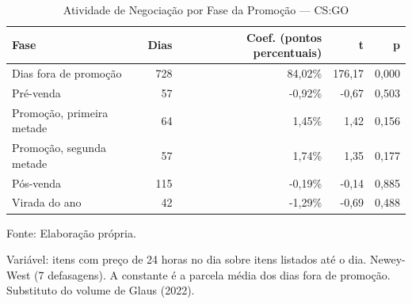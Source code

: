 \begin{table}[H]
\caption{Atividade de Negociação por Fase da Promoção — CS:GO}\label{tab:sale_activity} 

\fontsize{12.0pt}{14.4pt}\selectfont

\begin{tabular*}{\linewidth}{@{\extracolsep{\fill}}lrrrr}
\toprule
\textbf{Fase} & \textbf{Dias} & \textbf{Coef. (pontos percentuais)} & \textbf{t} & \textbf{p} \\
\midrule\addlinespace[2.5pt]
Dias fora de promoção & 728 & 84,02\% & 176,17 & 0,000 \\
Pré-venda & 57 & -0,92\% & -0,67 & 0,503 \\
Promoção, primeira metade & 64 & 1,45\% & 1,42 & 0,156 \\
Promoção, segunda metade & 57 & 1,74\% & 1,35 & 0,177 \\
Pós-venda & 115 & -0,19\% & -0,14 & 0,885 \\
Virada do ano & 42 & -1,29\% & -0,69 & 0,488 \\
\bottomrule
\end{tabular*}
\par\vspace{\belowcaptionskip}\footnotesize Fonte: Elaboração própria.\par
\begin{minipage}{\linewidth}
Variável: itens com preço de 24 horas no dia sobre itens listados até o dia. Newey-West (7 defasagens). A constante é a parcela média dos dias fora de promoção. Substituto do volume de Glaus (2022).\\
\end{minipage}
\end{table}
